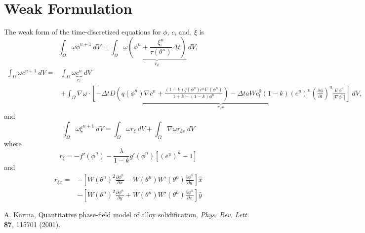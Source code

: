 \documentclass[10pt]{article}
\begin{document}
\section{Weak Formulation}
The weak form of the time-discretized equations for $\phi$,  $c$, and, $\xi$ is
\begin{equation}
\int_{\Omega}   \omega  \phi^{n+1}  ~dV = \int_{\Omega}   \omega \underbrace{\left(\phi^n + \frac{ \xi^n}{\tau(\theta^n)}\Delta t\right)}_{r_{\phi}} ~dV,
\end{equation}
\begin{equation}
\begin{split}
\int_{\Omega}   \omega  c^{n+1}  ~dV =& 
\int_{\Omega} \omega \underbrace{ c^{n} }_{r_c}~dV\\
&+\int_{\Omega}  \nabla  \omega  \cdot \underbrace{\left[-\Delta t D\left(q(\phi^n)\nabla c^n + \frac{(1-k)q(\phi^n)c^n\nabla(\phi^n)}{1+k-(1-k)\phi^n}\right)-\Delta t aWc_l^0(1-k)(e^u)^n \left(\frac{\partial \phi}{\partial t}\right)^n\frac{\nabla \phi^n}{|\nabla \phi^n|} \right]}_{r_cx}~dV,
\end{split}
\end{equation}
\newpage
and
\begin{equation}
\int_{\Omega}   \omega \xi^{n+1} ~dV =\int_{\Omega} \omega r_\xi ~dV + \int_{\Omega} \nabla \omega r_{\xi x} ~dV
\end{equation}
where
\begin{equation}
r_\xi= -f'(\phi^n) - \frac{\lambda}{1-k} g'(\phi^n)[(e^u)^n - 1]
\end{equation}
and 
\begin{equation}
\begin{split}
r_{\xi x}= &-\left[W(\theta^n)^2\frac{\partial \phi^n}{\partial x}-W(\theta^n)W'(\theta^n)\frac{\partial \phi^n}{\partial y}\right]\hat{x}\\
&-\left[W(\theta^n)^2\frac{\partial \phi^n}{\partial y}+W(\theta^n)W'(\theta^n)\frac{\partial \phi^n}{\partial x}\right]\hat{y}
\end{split}
\end{equation}

\begin{thebibliography}{plain}
     A. Karma, Quantitative phase-field model of alloy solidification, \emph{Phys. Rev. Lett.} {\bf 87}, 115701 (2001).
\end{thebibliography}
\end{document}
